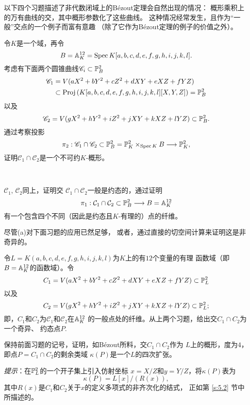 
以下四个习题描述了非代数闭域上的B\'ezout定理会自然出现的情况：
概形乘积上的万有曲线的交，其中概形参数化了这些曲线。
这种情况经常发生，且作为“一般”交点的一个例子而富有意趣
（除了它作为B\'ezout定理的例子的价值之外）。

\begin{exe}\label{exe:3.73}
令$K$是一个域，再令
\[
	B=\A_K^{12}=\spec K[a,b,c,d,e,f,g,h,i,j,k,l].
\]
考虑有下面两个圆锥曲线$\mathscr C_i\subset \P_B^2$
\begin{align*}
	\mathscr C_1&=V(aX^2+bY^2+cZ^2+dXY+eXZ+fYZ)\\
	&\subset \proj\left(
	K[a,b,c,d,e,f,g,h,i,j,k,l][X,Y,Z]
	\right)=\P_B^2
\end{align*}
以及
\[
	\mathscr C_2=
	V(gX^2+hY^2+iZ^2+jXY+kXZ+lYZ)\subset \P_B^2.
\]
通过考察投影
\[
	\pi_2:\mathscr C_1\cap \mathscr C_2
	\subset \P_B^2=\P_K^2\times_{\spec K}B
	\longrightarrow \P_K^2,
\]
证明$\mathscr C_1\cap \mathscr C_2$是一个不可约$K$-概形。
\end{exe}

\begin{exe}~\label{exe:3.74}
\begin{compactenum}[(a)]
	\item $\mathscr C_1$, $\mathscr C_2$同上，证明交
	$\mathscr C_1\cap \mathscr C_2$一般是约态的，通过证明
	\[
		\pi_1:\mathcal C_1\cap \mathcal C_2\subset \P_B^2
		\longrightarrow B=\A_K^{12}
	\]
	有一个包含四个不同（因此是约态且$K$-有理的）点的纤维。
	\item 尽管(a)对下面习题的应用已然足够，\nottran
	或者，通过直接的切空间计算来证明这是非奇异的。
\end{compactenum}
\end{exe}

\begin{exe}\label{exe:3.75}
令$L=K(a,b,c,d,e,f,g,h,i,j,k,l)$为$K$上的有$12$个变量的有理
函数域（即$B=\A_K^{12}$的函数域）。令
\[
	C_1=V(aX^2+bY^2+cZ^2+dXY+eXZ+fYZ)\subset \P_L^2
\]
以及
\[
	C_2=V(gX^2+hY^2+iZ^2+jXY+kXZ+lYZ)\subset \P_L^2;
\]
即，$C_1$和$C_2$为$\mathscr C_1$和$\mathscr C_2$在$\A_K^{12}$
的一般点处的纤维。从上两个习题，给出交$C_1\cap C_2$为一个奇异、
约态点$P$.
\end{exe}


\begin{exe}\label{exe:3.76}
保持前面习题的记号，证明，如B\'ezout所料，交$C_1\cap C_2$作为
$L$上的概形，度为$4$，即点$P=C_1\cap C_2$的剩余类域
$\kappa(P)$是一个$L$的四次扩张。

\textit{提示}：在$\P_L^2$的一个开子集上引入仿射坐标
$x=X/Z$和$y=Y/Z$，将$\kappa(P)$表为
\[
	\kappa(P)=L[x]/(R(x)),
\]
其中$R(x)$是$C_1$和$C_2$关于$x$的定义多项式的非齐次化的结式，
正如第 \ref{s:5.2} 节中所描述的。 \nottran
\end{exe}

